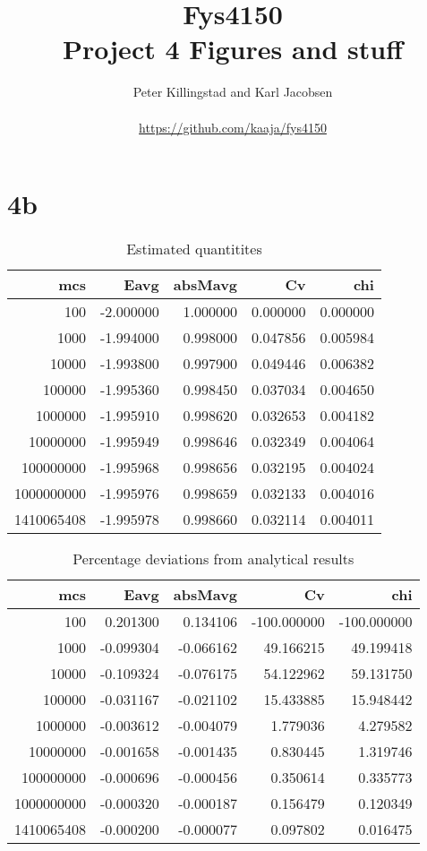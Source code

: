 \documentclass{article}
\title{Fys4150\\Project 4 Figures and stuff\\ }
\author{Peter Killingstad and Karl Jacobsen\\
\\
\url{https://github.com/kaaja/fys4150}}
\begin{document}
	
\maketitle



\section*{4b}



\begin{table}[H]
	\centering
\begin{tabular}{rrrrr}
	\hline
	mcs &      Eavg &   absMavg &        Cv &       chi \\
	\hline
	100 & -2.000000 &  1.000000 &  0.000000 &  0.000000 \\
	1000 & -1.994000 &  0.998000 &  0.047856 &  0.005984 \\
	10000 & -1.993800 &  0.997900 &  0.049446 &  0.006382 \\
	100000 & -1.995360 &  0.998450 &  0.037034 &  0.004650 \\
	1000000 & -1.995910 &  0.998620 &  0.032653 &  0.004182 \\
	10000000 & -1.995949 &  0.998646 &  0.032349 &  0.004064 \\
	100000000 & -1.995968 &  0.998656 &  0.032195 &  0.004024 \\
	1000000000 & -1.995976 &  0.998659 &  0.032133 &  0.004016 \\
	1410065408 & -1.995978 &  0.998660 &  0.032114 &  0.004011 \\
	\hline
\end{tabular}
	\caption{Estimated quantitites}
	\label{fig:4b1}
\end{table}

\begin{table}[H]
	\centering
\begin{tabular}{rrrrr}
	\hline
	mcs &      Eavg &   absMavg &          Cv &         chi \\
	\hline
	100 &  0.201300 &  0.134106 & -100.000000 & -100.000000 \\
	1000 & -0.099304 & -0.066162 &   49.166215 &   49.199418 \\
	10000 & -0.109324 & -0.076175 &   54.122962 &   59.131750 \\
	100000 & -0.031167 & -0.021102 &   15.433885 &   15.948442 \\
	1000000 & -0.003612 & -0.004079 &    1.779036 &    4.279582 \\
	10000000 & -0.001658 & -0.001435 &    0.830445 &    1.319746 \\
	100000000 & -0.000696 & -0.000456 &    0.350614 &    0.335773 \\
	1000000000 & -0.000320 & -0.000187 &    0.156479 &    0.120349 \\
	1410065408 & -0.000200 & -0.000077 &    0.097802 &    0.016475 \\
	\hline
\end{tabular}
	\caption{Percentage deviations from analytical results}
	\label{fig:4b2}
\end{table}
\end{document}
